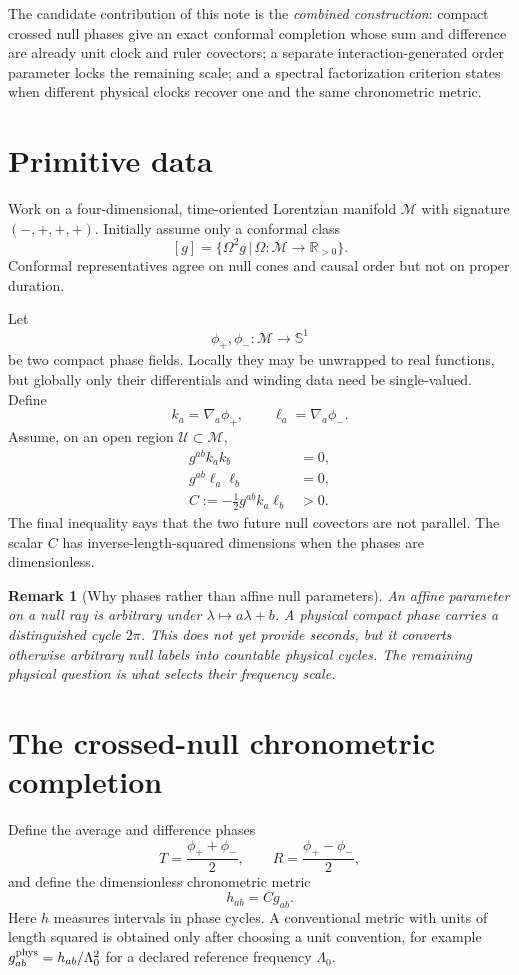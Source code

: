 \documentclass[11pt,a4paper]{article}
\newtheorem{remark}[definition]{Remark}
\newcommand{\M}{\mathcal{M}}
\newcommand{\R}{\mathbb{R}}
\newcommand{\Sph}{\mathbb{S}}
\newcommand{\Ccross}{C}
\begin{document}
The candidate contribution of this note is the \emph{combined construction}: compact crossed null phases give an exact conformal completion whose sum and difference are already unit clock and ruler covectors; a separate interaction-generated order parameter locks the remaining scale; and a spectral factorization criterion states when different physical clocks recover one and the same chronometric metric.

\section{Primitive data}

Work on a four-dimensional, time-oriented Lorentzian manifold $\M$ with signature $(-,+,+,+)$. Initially assume only a conformal class
\[
[g]=\{\Omega^2 g\,|\,\Omega:\M\to\R_{>0}\}.
\]
Conformal representatives agree on null cones and causal order but not on proper duration.

Let
\[
\phi_+,\phi_-:\M\rightarrow \Sph^1
\]
be two compact phase fields. Locally they may be unwrapped to real functions, but globally only their differentials and winding data need be single-valued. Define
\[
k_a=\nabla_a\phi_+,
\qquad
\ell_a=\nabla_a\phi_-.
\]
Assume, on an open region $\mathcal U\subset\M$,
\begin{align}
 g^{ab}k_ak_b&=0,\\
 g^{ab}\ell_a\ell_b&=0,\\
 \Ccross:=-\frac12g^{ab}k_a\ell_b&>0.
\end{align}
The final inequality says that the two future null covectors are not parallel. The scalar $\Ccross$ has inverse-length-squared dimensions when the phases are dimensionless.

\begin{remark}[Why phases rather than affine null parameters]
An affine parameter on a null ray is arbitrary under $\lambda\mapsto a\lambda+b$. A physical compact phase carries a distinguished cycle $2\pi$. This does not yet provide seconds, but it converts otherwise arbitrary null labels into countable physical cycles. The remaining physical question is what selects their frequency scale.
\end{remark}

\section{The crossed-null chronometric completion}

Define the average and difference phases
\begin{equation}
T=\frac{\phi_++\phi_-}{2},
\qquad
R=\frac{\phi_+-\phi_-}{2},
\label{eq:TRdef}
\end{equation}
and define the dimensionless chronometric metric
\begin{equation}
\boxed{h_{ab}=\Ccross g_{ab}.}
\label{eq:hdef}
\end{equation}
Here $h$ measures intervals in phase cycles. A conventional metric with units of length squared is obtained only after choosing a unit convention, for example $g^{\rm phys}_{ab}=h_{ab}/\Lambda_0^2$ for a declared reference frequency $\Lambda_0$.
\end{document}
